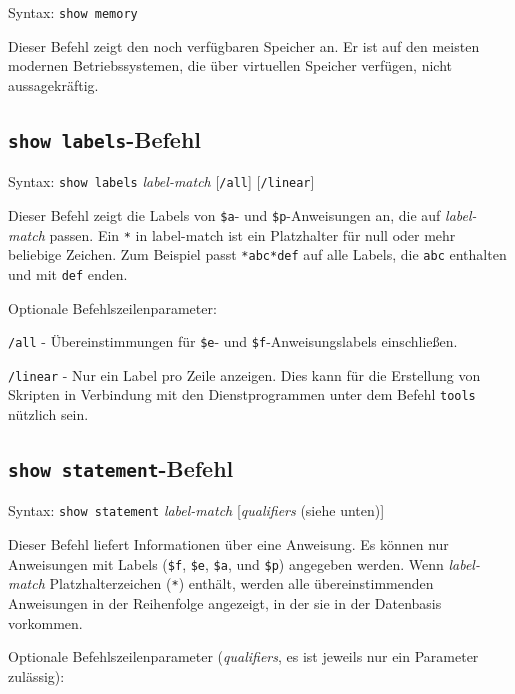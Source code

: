 Syntax:  \texttt{show memory}

Dieser Befehl zeigt den noch verfügbaren Speicher an.  Er ist auf den meisten modernen Betriebssystemen, die über virtuellen Speicher verfügen, nicht aussagekräftig.

\subsection{\texttt{show labels}-Befehl}

Syntax:  \texttt{show labels} {\em label-match} [\texttt{/all}]
   [\texttt{/linear}]

Dieser Befehl zeigt die Labels von \texttt{\$a}- und \texttt{\$p}-Anweisungen an, die auf {\em label-match} passen.  Ein \verb$*$ in {label-match} ist ein Platzhalter für null oder mehr beliebige Zeichen.  Zum Beispiel passt \verb$*abc*def$ auf alle Labels, die \verb$abc$ enthalten und mit \verb$def$ enden.

Optionale Befehlszeilenparameter:

   \texttt{/all} -
    Übereinstimmungen für \texttt{\$e}- und \texttt{\$f}-Anweisungslabels einschließen.

   \texttt{/linear} -
    Nur ein Label pro Zeile anzeigen.  Dies kann für die Erstellung von Skripten in Verbindung mit den Dienstprogrammen unter dem Befehl \texttt{tools} nützlich sein.


\subsection{\texttt{show statement}-Befehl}

Syntax:  \texttt{show statement} {\em label-match} [{\em qualifiers} (siehe unten)]

Dieser Befehl liefert Informationen über eine Anweisung.  Es können nur Anweisungen mit Labels (\texttt{\$f},
\texttt{\$e},
\texttt{\$a}, und
\texttt{\$p}) angegeben werden.
Wenn {\em label-match} Platzhalterzeichen (\verb$*$) enthält, werden alle übereinstimmenden Anweisungen in der Reihenfolge angezeigt, in der sie in der Datenbasis vorkommen.

Optionale Befehlszeilenparameter ({\em qualifiers}, es ist jeweils nur ein Parameter zulässig):

